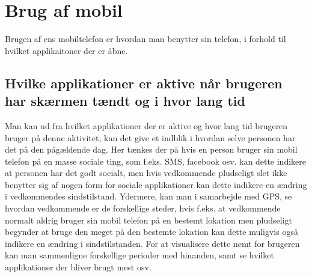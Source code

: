 \section{Brug af mobil}
Brugen af ens mobiltelefon er hvordan man benytter sin telefon, i forhold til hvilket applikaitoner der er åbne.

\subsection{Hvilke applikationer er aktive når brugeren har skærmen tændt og i hvor lang tid}
Man kan ud fra hvilket applikationer der er aktive og hvor lang tid brugeren bruger på denne aktivitet, kan det give et indblik i hvordan selve personen har det på den pågældende dag.
Her tænkes der på hvis en person bruger sin mobil telefon på en masse sociale ting, som f.eks. SMS, facebook osv. kan dette indikere at personen har det godt socialt, men hvis vedkommende pludseligt slet ikke benytter sig af nogen form for sociale applikationer kan dette indikere en ændring i vedkommendes sindstilstand.
Ydermere, kan man i samarbejde med GPS, se hvordan vedkommende er de forskellige steder, hvis f.eks. at vedkommende normalt aldrig bruger sin mobil telefon på en bestemt lokation men pludseligt begynder at bruge den meget på den bestemte lokation kan dette muligvis også indikere en ændring i sindstilstanden.
For at visualisere dette nemt for brugeren kan man sammenligne forskellige perioder med hinanden, samt se hvilket applikationer der bliver brugt mest osv.


